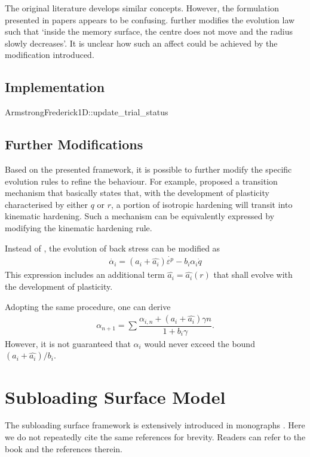 The original literature \cite{Ohno1982,Nouailhas1985} develops similar concepts.
However, the formulation presented in papers appears to be confusing.
\cite{Nouailhas1985} further modifies the evolution law such that `inside the memory surface, the centre does not move and the radius slowly decreases'.
It is unclear how such an affect could be achieved by the modification introduced.
\subsection{Implementation}
\begin{cppcode}
ArmstrongFrederick1D::update_trial_status
\end{cppcode}
\subsection{Further Modifications}
Based on the presented framework, it is possible to further modify the specific evolution rules to refine the behaviour.
For example, \cite{Xu2016} proposed a transition mechanism that basically states that, with the development of plasticity characterised by either $q$ or $r$, a portion of isotropic hardening will transit into kinematic hardening.
Such a mechanism can be equivalently expressed by modifying the kinematic hardening rule.

Instead of , the evolution of back stress can be modified as
\begin{gather}
\dot{\alpha_i}=\left(a_i+\hat{a_i}\right)\dot{\varepsilon^p}-b_i\alpha_i\dot{q}
\end{gather}
This expression includes an additional term $\hat{a_i}=\hat{a_i}\left(r\right)$ that shall evolve with the development of plasticity.

Adopting the same procedure, one can derive
\begin{gather}
\alpha_{n+1}=\sum\dfrac{\alpha_{i,n}+\left(a_i+\hat{a_i}\right)\gamma{}n}{1+b_i\gamma}.
\end{gather}
However, it is not guaranteed that $\alpha_i$ would never exceed the bound $\left(a_i+\hat{a_i}\right)/b_i$.
\section{Subloading Surface Model}\label{sec:uniaxial_subloading}
The subloading surface framework is extensively introduced in monographs \cite{Hashiguchi2023}.
Here we do not repeatedly cite the same references for brevity.
Readers can refer to the book and the references therein.

